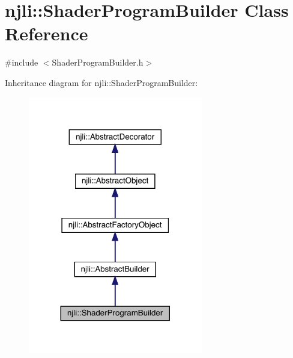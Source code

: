 \hypertarget{classnjli_1_1_shader_program_builder}{}\section{njli\+:\+:Shader\+Program\+Builder Class Reference}
\label{classnjli_1_1_shader_program_builder}


{\ttfamily \#include $<$Shader\+Program\+Builder.\+h$>$}



Inheritance diagram for njli\+:\+:Shader\+Program\+Builder\+:\nopagebreak
\begin{figure}[H]
\begin{center}
\leavevmode
\includegraphics[width=216pt]{classnjli_1_1_shader_program_builder__inherit__graph}
\end{center}
\end{figure}



